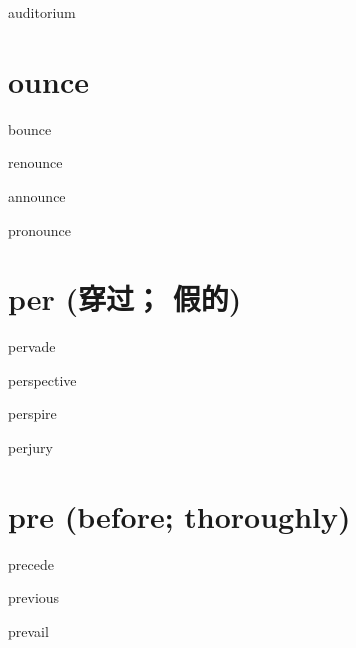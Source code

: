 \begin{RefWord}{auditorium}
\end{RefWord}


\section{ounce}

\begin{RefWord}{bounce}
\end{RefWord}

\begin{RefWord}{renounce}
\end{RefWord}

\begin{RefWord}{announce}
\end{RefWord}

\begin{RefWord}{pronounce}
\end{RefWord}



\section{per (穿过； 假的)}


\begin{RefWord}{pervade}
\end{RefWord}

\begin{RefWord}{perspective}
\end{RefWord}

\begin{RefWord}{perspire}
\end{RefWord}

\begin{RefWord}{perjury}
\end{RefWord}

\section{pre (before; thoroughly)}
\begin{RefWord}{precede}
\end{RefWord}

\begin{RefWord}{previous}
\end{RefWord}

\begin{RefWord}{prevail}
\end{RefWord}

